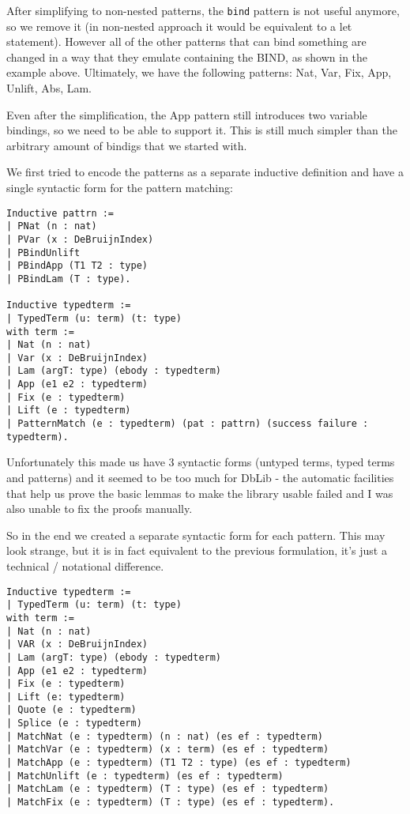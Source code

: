 \documentclass[runningheads]{article}
\begin{document}
After simplifying to non-nested patterns, the \texttt{bind} pattern is not useful anymore, so we remove it (in non-nested approach it would be equivalent to a let statement). However all of the other patterns that can bind something are changed in a way that they emulate containing the BIND, as shown in the example above. Ultimately, we have the following patterns: Nat, Var, Fix, App, Unlift, Abs, Lam.

Even after the simplification, the App pattern still introduces two variable bindings, so we need to be able to support it. This is still much simpler than the arbitrary amount of bindigs that we started with.

We first tried to encode the patterns as a separate inductive definition and have a single syntactic form for the pattern matching:
\begin{verbatim}
Inductive pattrn :=
| PNat (n : nat)
| PVar (x : DeBruijnIndex)
| PBindUnlift
| PBindApp (T1 T2 : type)
| PBindLam (T : type).

Inductive typedterm :=
| TypedTerm (u: term) (t: type)
with term :=
| Nat (n : nat)
| Var (x : DeBruijnIndex)
| Lam (argT: type) (ebody : typedterm)
| App (e1 e2 : typedterm)
| Fix (e : typedterm)
| Lift (e : typedterm)
| PatternMatch (e : typedterm) (pat : pattrn) (success failure : typedterm).
\end{verbatim}

Unfortunately this made us have 3 syntactic forms (untyped terms, typed terms and patterns) and it seemed to be too much for DbLib - the automatic facilities that help us prove the basic lemmas to make the library usable failed and I was also unable to fix the proofs manually.

So in the end we created a separate syntactic form for each pattern. This may look strange, but it is in fact equivalent to the previous formulation, it's just a technical / notational difference.

\begin{verbatim}
Inductive typedterm :=
| TypedTerm (u: term) (t: type)
with term :=
| Nat (n : nat)
| VAR (x : DeBruijnIndex)
| Lam (argT: type) (ebody : typedterm)
| App (e1 e2 : typedterm)
| Fix (e : typedterm)
| Lift (e: typedterm)
| Quote (e : typedterm)
| Splice (e : typedterm)
| MatchNat (e : typedterm) (n : nat) (es ef : typedterm)
| MatchVar (e : typedterm) (x : term) (es ef : typedterm)
| MatchApp (e : typedterm) (T1 T2 : type) (es ef : typedterm)
| MatchUnlift (e : typedterm) (es ef : typedterm)
| MatchLam (e : typedterm) (T : type) (es ef : typedterm)
| MatchFix (e : typedterm) (T : type) (es ef : typedterm).
\end{verbatim}
\end{document}
